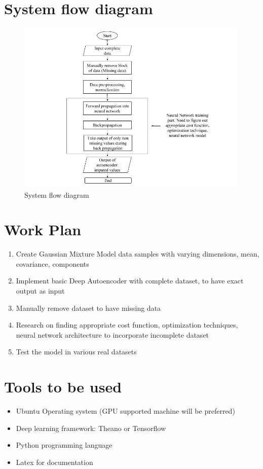 \section{System flow diagram}
\begin{figure}[H]
\centering
\includegraphics[width=0.99\textwidth]{figures/flowdiagram.png}
\caption{\label{fig:flowchart} System flow diagram }
\end{figure}
\vspace{3cm}
\section{ Work Plan }
\begin{enumerate}
\item Create Gaussian Mixture Model data samples with varying dimensions, mean, covariance, components
\item Implement basic Deep Autoencoder with complete dataset, to have exact output as input
\item Manually remove dataset to have missing data
\item Research on finding appropriate cost function, optimization techniques, neural network architecture to incorporate incomplete dataset
\item Test the model in various real datasets 
\end{enumerate}
\section{Tools to be used}
\begin{itemize}
\item Ubuntu Operating system (GPU supported machine will be preferred)
\item Deep learning framework: Theano or Tensorflow
\item Python programming language
\item Latex for documentation
\end{itemize}

